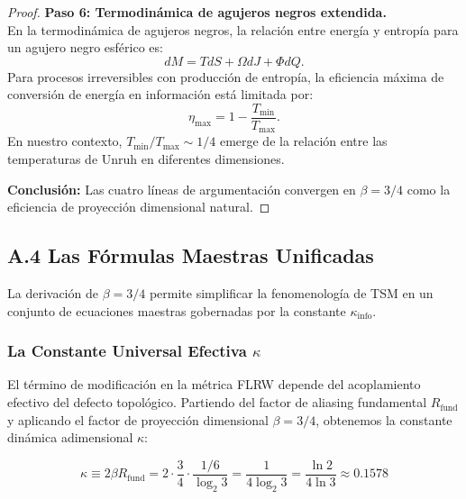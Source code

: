 \documentclass[11pt, a4paper]{article}
\theoremstyle{plain}
\theoremstyle{definition}
\begin{document}
\begin{proof}
\textbf{Paso 6: Termodinámica de agujeros negros extendida.} \\
En la termodinámica de agujeros negros, la relación entre energía y entropía para un agujero negro esférico es:
\begin{equation}
dM = T dS + \Omega dJ + \Phi dQ.
\end{equation}
Para procesos irreversibles con producción de entropía, la eficiencia máxima de conversión de energía en información está limitada por:
\begin{equation}
\eta_{\text{max}} = 1 - \frac{T_{\text{min}}}{T_{\text{max}}}.
\end{equation}
En nuestro contexto, $T_{\text{min}}/T_{\text{max}} \sim 1/4$ emerge de la relación entre las temperaturas de Unruh en diferentes dimensiones.

\textbf{Conclusión:} Las cuatro líneas de argumentación convergen en $\beta = 3/4$ como la eficiencia de proyección dimensional natural.
\end{proof}


\subsection{A.4 Las Fórmulas Maestras Unificadas}
\label{app:master_formulas}

La derivación de $\beta = 3/4$ permite simplificar la fenomenología de TSM en un conjunto de ecuaciones maestras gobernadas por la constante $\kappa_{\text{info}}$.

\subsubsection{La Constante Universal Efectiva \texorpdfstring{$\kappa$}{kappa}}
El término de modificación en la métrica FLRW depende del acoplamiento efectivo del defecto topológico. Partiendo del factor de aliasing fundamental $R_{\text{fund}}$ y aplicando el factor de proyección dimensional $\beta=3/4$, obtenemos la constante dinámica adimensional $\kappa$:

\begin{equation}
\kappa \equiv 2\beta R_{\text{fund}} = 2 \cdot \frac{3}{4} \cdot \frac{1/6}{\log_2 3} = \frac{1}{4 \log_2 3} = \frac{\ln 2}{4 \ln 3} \approx 0.1578
\end{equation}
\end{document}
